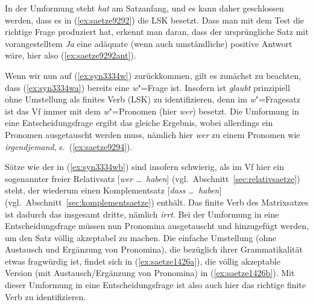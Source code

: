 \begin{exe}
\end{exe}

In der Umformung steht \textit{hat} am Satzanfang, und es kann daher geschlossen werden, dass es in (\ref{ex:saetze9292}) die LSK besetzt.
Dass man mit dem Test die richtige Frage produziert hat, erkennt man daran, dass der ursprüngliche Satz mit vorangestelltem \textit{Ja} eine adäquate (wenn auch umständliche) positive Antwort wäre, hier also (\ref{ex:saetze9292ant}).

\begin{exe}
\end{exe}

Wenn wir nun auf (\ref{ex:syn3334w}) zurückkommen, gilt es zunächst zu beachten, dass (\ref{ex:syn3334wa}) bereits eine \textit{w}"=Frage ist.
Insofern ist \textit{glaubt} prinzipiell ohne Umstellung als finites Verb (LSK) zu identifizieren, denn im \textit{w}"=Fragesatz ist das Vf immer mit dem \textit{w}"=Pro\-no\-men (hier \textit{wer}) besetzt.
Die Umformung in eine Entscheidungsfrage ergibt das gleiche Ergebnis, wobei allerdings ein Pronomen ausgetauscht werden muss, nämlich hier \textit{wer} zu einem Pronomen wie \textit{irgendjemand}, s.\ (\ref{ex:saetze9294}).

\begin{exe}
\end{exe}

Sätze wie der in (\ref{ex:syn3334wb}) sind insofern schwierig, als im Vf hier ein sogenannter freier Relativsatz [\textit{wer \ldots\ haben}] (vgl.\ Abschnitt~\ref{sec:relativsaetze}) steht, der wiederum einen Komplementsatz [\textit{dass \ldots\ haben}] (vgl.\ Abschnitt~\ref{sec:komplementsaetze}) enthält.
Das finite Verb des Matrixsatzes ist dadurch das insgesamt dritte, nämlich \textit{irrt}.
Bei der Umformung in eine Entscheidungsfrage müssen nun Pronomina ausgetauscht und hinzugefügt werden, um den Satz völlig akzeptabel zu machen.
Die einfache Umstellung (ohne Austausch und Ergänzung von Pronomina), die bezüglich ihrer Grammatikalität etwas fragwürdig ist, findet sich in (\ref{ex:saetze1426a}), die völlig akzeptable Version (mit Austausch\slash Ergänzung von Pronomina) in (\ref{ex:saetze1426b}).
Mit dieser Umformung in eine Entscheidungsfrage ist also auch hier das richtige finite Verb zu identifizieren.

